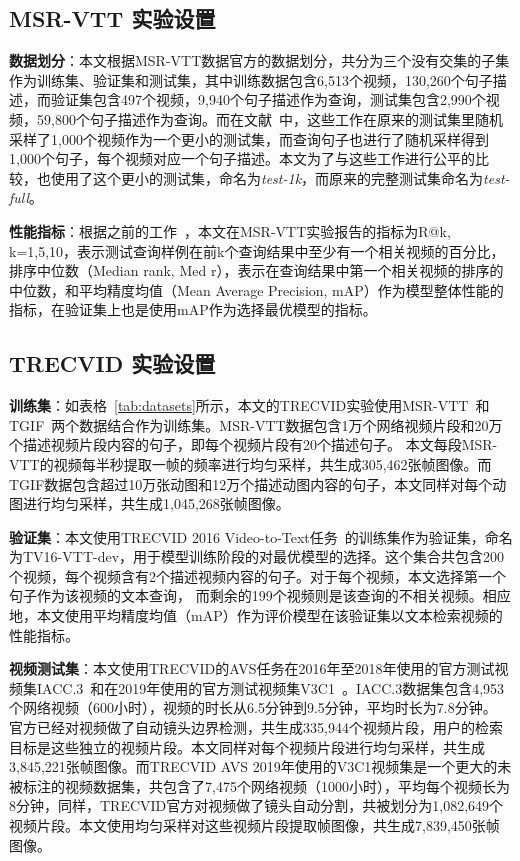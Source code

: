 

\subsection{MSR-VTT 实验设置}
\textbf{数据划分}：本文根据MSR-VTT数据官方的数据划分，共分为三个没有交集的子集作为训练集、验证集和测试集，其中训练数据包含6,513个视频，130,260个句子描述，而验证集包含497个视频，9,940个句子描述作为查询，测试集包含2,990个视频，59,800个句子描述作为查询。而在文献~\cite{}中，这些工作在原来的测试集里随机采样了1,000个视频作为一个更小的测试集，而查询句子也进行了随机采样得到1,000个句子，每个视频对应一个句子描述。本文为了与这些工作进行公平的比较，也使用了这个更小的测试集，命名为\textit{test-1k}，而原来的完整测试集命名为\textit{test-full}。

\textbf{性能指标}：根据之前的工作~\cite{}，本文在MSR-VTT实验报告的指标为R@k, k=1,5,10，表示测试查询样例在前k个查询结果中至少有一个相关视频的百分比，排序中位数（Median rank, Med r），表示在查询结果中第一个相关视频的排序的中位数，和平均精度均值（Mean Average Precision, mAP）作为模型整体性能的指标，在验证集上也是使用mAP作为选择最优模型的指标。

\subsection{TRECVID 实验设置}

\textbf{训练集}：如表格~\ref{tab:datasets}所示，本文的TRECVID实验使用MSR-VTT~\cite{msrvtt}和TGIF~\cite{li2016tgif}两个数据结合作为训练集。MSR-VTT数据包含1万个网络视频片段和20万个描述视频片段内容的句子，即每个视频片段有20个描述句子。
本文每段MSR-VTT的视频每半秒提取一帧的频率进行均匀采样，共生成305,462张帧图像。而TGIF数据包含超过10万张动图和12万个描述动图内容的句子，本文同样对每个动图进行均匀采样，共生成1,045,268张帧图像。

\textbf{验证集}：本文使用TRECVID 2016 Video-to-Text任务~\cite{awad2016trecvid}的训练集作为验证集，命名为TV16-VTT-dev，用于模型训练阶段的对最优模型的选择。这个集合共包含200个视频，每个视频含有2个描述视频内容的句子。对于每个视频，本文选择第一个句子作为该视频的文本查询，
而剩余的199个视频则是该查询的不相关视频。相应地，本文使用平均精度均值（mAP）作为评价模型在该验证集以文本检索视频的性能指标。

\textbf{视频测试集}：本文使用TRECVID的AVS任务在2016年至2018年使用的官方测试视频集IACC.3~\cite{awad2016trecvid}和在2019年使用的官方测试视频集V3C1~\cite{berns2019v3c1}。IACC.3数据集包含4,953个网络视频（600小时），视频的时长从6.5分钟到9.5分钟，平均时长为7.8分钟。
官方已经对视频做了自动镜头边界检测，共生成335,944个视频片段，用户的检索目标是这些独立的视频片段。本文同样对每个视频片段进行均匀采样，共生成3,845,221张帧图像。而TRECVID AVS 2019年使用的V3C1视频集是一个更大的未被标注的视频数据集，共包含了7,475个网络视频（1000小时），平均每个视频长为8分钟，同样，TRECVID官方对视频做了镜头自动分割，共被划分为1,082,649个视频片段。本文使用均匀采样对这些视频片段提取帧图像，共生成7,839,450张帧图像。

